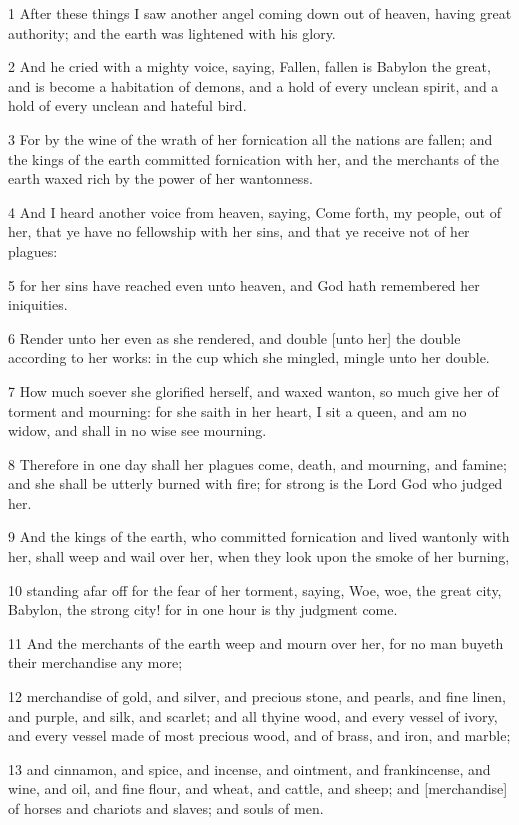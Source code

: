 \par 1 After these things I saw another angel coming down out of heaven, having great authority; and the earth was lightened with his glory.
\par 2 And he cried with a mighty voice, saying, Fallen, fallen is Babylon the great, and is become a habitation of demons, and a hold of every unclean spirit, and a hold of every unclean and hateful bird.
\par 3 For by the wine of the wrath of her fornication all the nations are fallen; and the kings of the earth committed fornication with her, and the merchants of the earth waxed rich by the power of her wantonness.
\par 4 And I heard another voice from heaven, saying, Come forth, my people, out of her, that ye have no fellowship with her sins, and that ye receive not of her plagues:
\par 5 for her sins have reached even unto heaven, and God hath remembered her iniquities.
\par 6 Render unto her even as she rendered, and double [unto her] the double according to her works: in the cup which she mingled, mingle unto her double.
\par 7 How much soever she glorified herself, and waxed wanton, so much give her of torment and mourning: for she saith in her heart, I sit a queen, and am no widow, and shall in no wise see mourning.
\par 8 Therefore in one day shall her plagues come, death, and mourning, and famine; and she shall be utterly burned with fire; for strong is the Lord God who judged her.
\par 9 And the kings of the earth, who committed fornication and lived wantonly with her, shall weep and wail over her, when they look upon the smoke of her burning,
\par 10 standing afar off for the fear of her torment, saying, Woe, woe, the great city, Babylon, the strong city! for in one hour is thy judgment come.
\par 11 And the merchants of the earth weep and mourn over her, for no man buyeth their merchandise any more;
\par 12 merchandise of gold, and silver, and precious stone, and pearls, and fine linen, and purple, and silk, and scarlet; and all thyine wood, and every vessel of ivory, and every vessel made of most precious wood, and of brass, and iron, and marble;
\par 13 and cinnamon, and spice, and incense, and ointment, and frankincense, and wine, and oil, and fine flour, and wheat, and cattle, and sheep; and [merchandise] of horses and chariots and slaves; and souls of men.
